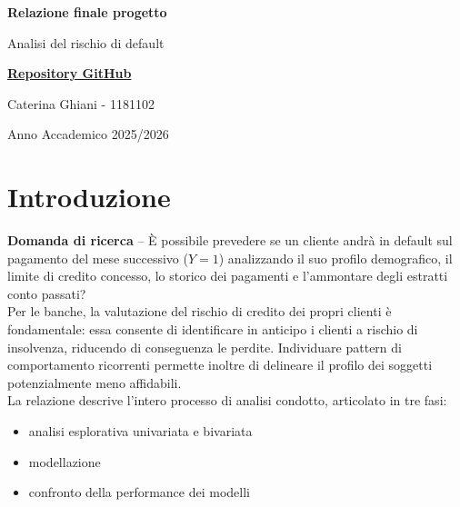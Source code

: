 \documentclass{article}
\begin{document}
\begin{titlepage}
    \centering

    \vspace{2cm}

    {\Huge\bfseries Relazione finale progetto\par}

    \vspace{0.5cm}

    {\Large Analisi del rischio di default \par}

    \vspace{2cm}
    
    {\Large 
    \href{https://github.com/caterinaghiani/progetto_datascience}{\textbf{Repository GitHub}}
    \par}

    \vspace{1.5cm}

    {\large
    Caterina Ghiani - 1181102
    }

    \vfill

    {\large Anno Accademico 2025/2026 \par}
\end{titlepage}


\thispagestyle{empty}
\newpage
\tableofcontents
\thispagestyle{empty}
\newpage

\setcounter{page}{1}
\section{Introduzione}
\textbf{Domanda di ricerca} -- \`E possibile prevedere se un cliente andr\`a in default sul pagamento del mese successivo ($Y=1$) analizzando il suo profilo demografico, il limite di credito concesso, lo storico dei pagamenti e l'ammontare degli estratti conto passati?
\\
Per le banche, la valutazione del rischio di credito dei propri clienti \`e fondamentale: essa consente di identificare in anticipo i clienti a rischio di insolvenza, riducendo di conseguenza le perdite. Individuare pattern di comportamento ricorrenti permette inoltre di delineare il profilo dei soggetti potenzialmente meno affidabili.
\\
La relazione descrive l'intero processo di analisi condotto, articolato in tre fasi: 
\begin{itemize}
    \item analisi esplorativa univariata e bivariata 
    \item modellazione
    \item confronto della performance dei modelli
\end{itemize}
\end{document}
